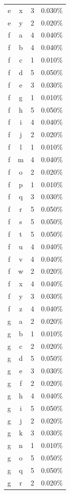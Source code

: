 \begin{longtable}{cccc}
    e & x & 3 & 0.030\% \\
    e & y & 2 & 0.020\% \\
    f & a & 4 & 0.040\% \\
    f & b & 4 & 0.040\% \\
    f & c & 1 & 0.010\% \\
    f & d & 5 & 0.050\% \\
    f & e & 3 & 0.030\% \\
    f & g & 1 & 0.010\% \\
    f & h & 5 & 0.050\% \\
    f & i & 4 & 0.040\% \\
    f & j & 2 & 0.020\% \\
    f & l & 1 & 0.010\% \\
    f & m & 4 & 0.040\% \\
    f & o & 2 & 0.020\% \\
    f & p & 1 & 0.010\% \\
    f & q & 3 & 0.030\% \\
    f & r & 5 & 0.050\% \\
    f & s & 5 & 0.050\% \\
    f & t & 5 & 0.050\% \\
    f & u & 4 & 0.040\% \\
    f & v & 4 & 0.040\% \\
    f & w & 2 & 0.020\% \\
    f & x & 4 & 0.040\% \\
    f & y & 3 & 0.030\% \\
    f & z & 4 & 0.040\% \\
    g & a & 2 & 0.020\% \\
    g & b & 1 & 0.010\% \\
    g & c & 2 & 0.020\% \\
    g & d & 5 & 0.050\% \\
    g & e & 3 & 0.030\% \\
    g & f & 2 & 0.020\% \\
    g & h & 4 & 0.040\% \\
    g & i & 5 & 0.050\% \\
    g & j & 2 & 0.020\% \\
    g & k & 3 & 0.030\% \\
    g & n & 1 & 0.010\% \\
    g & o & 5 & 0.050\% \\
    g & q & 5 & 0.050\% \\
    g & r & 2 & 0.020\% \\

\end{longtable}
